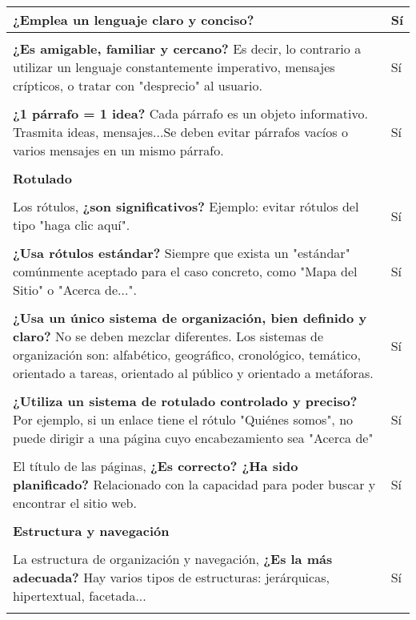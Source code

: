 \begin{longtable}[H]{p{31em}|p{5em}}
\textbf{¿Emplea un lenguaje claro y conciso?} & Sí \\ \hline \\[-1em]
\textbf{¿Es amigable, familiar y cercano?} Es decir, lo contrario a utilizar un lenguaje constantemente imperativo, mensajes crípticos, o tratar con "desprecio" al usuario. & Sí \\ \hline \\[-1em]
\textbf{¿1 párrafo = 1 idea?} Cada párrafo es un objeto informativo. Trasmita ideas, mensajes...Se deben evitar párrafos vacíos o varios mensajes en un mismo párrafo. & Sí \\ \hline \\[-1em]
\multicolumn{2}{p{36em}}{\cellcolor[rgb]{ .851,  .886,  .953} \textbf{Rotulado}} \\ \hline \\[-1em]
Los rótulos, \textbf{¿son significativos?} Ejemplo: evitar rótulos del tipo "haga clic aquí". & Sí \\ \hline \\[-1em]
\textbf{¿Usa rótulos estándar?} Siempre que exista un "estándar" comúnmente aceptado para el caso concreto, como "Mapa del Sitio" o "Acerca de...". & Sí \\ \hline \\[-1em]
\textbf{¿Usa un único sistema de organización, bien definido y claro?} No se deben mezclar diferentes. Los sistemas de organización son: alfabético, geográfico, cronológico, temático, orientado a tareas, orientado al público y orientado a metáforas. & Sí \\ \hline \\[-1em]
\textbf{¿Utiliza un sistema de rotulado controlado y preciso?} Por ejemplo, si un enlace tiene el rótulo "Quiénes somos", no puede dirigir a una página cuyo encabezamiento sea "Acerca de" & Sí \\ \hline \\[-1em]
El título de las páginas, \textbf{¿Es correcto? ¿Ha sido planificado?} Relacionado con la capacidad para poder buscar y encontrar el sitio web. & Sí \\ \hline \\[-1em]
\multicolumn{2}{p{36em}}{\cellcolor[rgb]{ .851,  .886,  .953} \textbf{Estructura y navegación}} \\ \hline \\[-1em]
La estructura de organización y navegación, \textbf{¿Es la más adecuada?} Hay varios tipos de estructuras: jerárquicas, hipertextual, facetada... & Sí \\ \hline \\[-1em]

\end{longtable}
